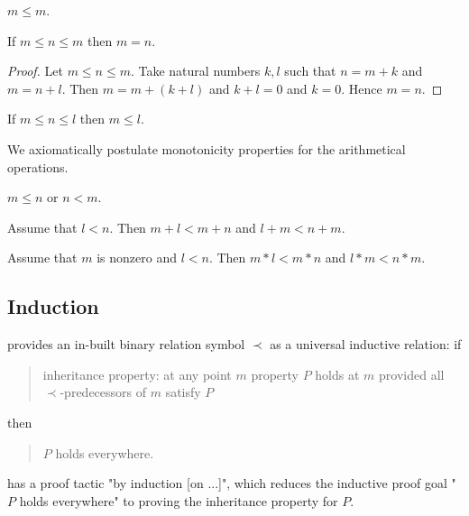 \documentclass[11pt]{article}
\begin{document}
\begin{forthel}

\begin{lemma}
$m \leq m$.
\end{lemma}

\begin{lemma}
If $m \leq n \leq m$ then $m = n$.
\end{lemma}
\begin{proof}
Let $m \leq n \leq m$.
Take natural numbers $k,l$ such that
$n = m + k$ and $m = n + l$.
Then $m = m + (k + l)$ and $k + l = 0$ and $k = 0$.
Hence $m = n$.
\end{proof}

\begin{lemma}
If $m \leq n \leq l$ then  $m \leq l$.
\end{lemma}
\end{forthel}
We axiomatically postulate monotonicity properties for the arithmetical operations.
\begin{forthel}
\begin{axiom}
$m \leq n$ or $n < m$.
\end{axiom}

\begin{lemma}
Assume that $l < n$.
Then $m + l < m + n$ and $l + m < n + m$.
\end{lemma}

\begin{lemma}
Assume that $m$ is nonzero and $l < n$.
Then $m * l < m * n$ and $l * m < n * m$.
\end{lemma}
\end{forthel}


\subsection{Induction}

\Naproche{} provides an in-built binary relation
symbol $\prec$ as a universal inductive relation: if 

\begin{quote}
inheritance property: at any
point $m$ property $P$ holds at $m$ provided all
$\prec$-predecessors of $m$ satisfy $P$ 
\end{quote} 
then 
\begin{quote}
$P$ holds everywhere.
\end{quote}

\Naproche{} has a proof tactic "by induction [on ...]", which 
reduces the inductive proof goal "$P$ holds everywhere" 
to proving the inheritance property for $P$.
\end{document}
